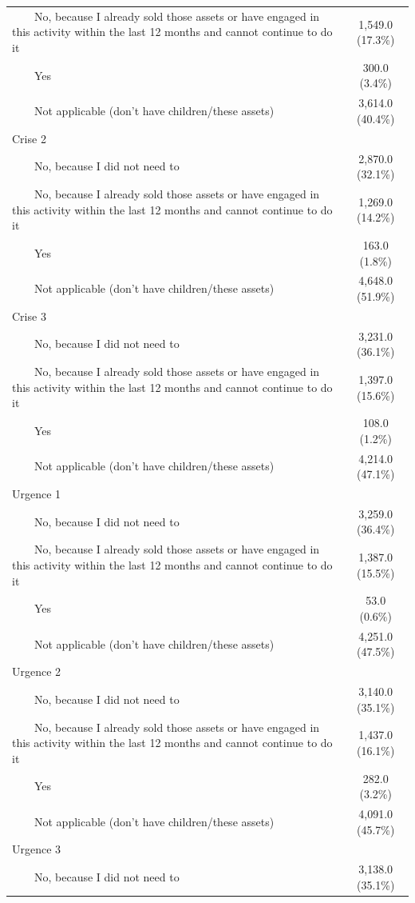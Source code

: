 \documentclass[
]{article}
\begin{document}
\begin{table}[!t]
\begin{tabular*}{\linewidth}{@{\extracolsep{\fill}}lc}
    No, because I already sold those assets or have engaged in this activity within the last 12 months and cannot continue to do it & 1,549.0 (17.3\%) \\ 
    Yes & 300.0 (3.4\%) \\ 
    Not applicable (don't have children/these assets) & 3,614.0 (40.4\%) \\ 
Crise 2 &  \\ 
    No, because I did not need to & 2,870.0 (32.1\%) \\ 
    No, because I already sold those assets or have engaged in this activity within the last 12 months and cannot continue to do it & 1,269.0 (14.2\%) \\ 
    Yes & 163.0 (1.8\%) \\ 
    Not applicable (don't have children/these assets) & 4,648.0 (51.9\%) \\ 
Crise 3 &  \\ 
    No, because I did not need to & 3,231.0 (36.1\%) \\ 
    No, because I already sold those assets or have engaged in this activity within the last 12 months and cannot continue to do it & 1,397.0 (15.6\%) \\ 
    Yes & 108.0 (1.2\%) \\ 
    Not applicable (don't have children/these assets) & 4,214.0 (47.1\%) \\ 
Urgence 1 &  \\ 
    No, because I did not need to & 3,259.0 (36.4\%) \\ 
    No, because I already sold those assets or have engaged in this activity within the last 12 months and cannot continue to do it & 1,387.0 (15.5\%) \\ 
    Yes & 53.0 (0.6\%) \\ 
    Not applicable (don't have children/these assets) & 4,251.0 (47.5\%) \\ 
Urgence 2 &  \\ 
    No, because I did not need to & 3,140.0 (35.1\%) \\ 
    No, because I already sold those assets or have engaged in this activity within the last 12 months and cannot continue to do it & 1,437.0 (16.1\%) \\ 
    Yes & 282.0 (3.2\%) \\ 
    Not applicable (don't have children/these assets) & 4,091.0 (45.7\%) \\ 
Urgence 3 &  \\ 
    No, because I did not need to & 3,138.0 (35.1\%) \\ 

\end{tabular*}
\end{table}
\end{document}
